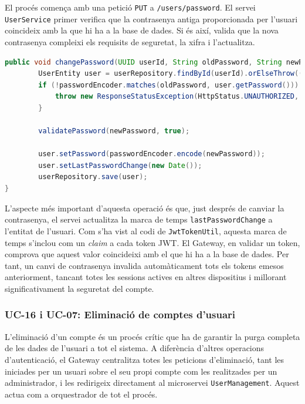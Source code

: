 El procés comença amb una petició \texttt{PUT} a \texttt{/users/password}. El servei \texttt{UserService} primer verifica que la contrasenya antiga proporcionada per l'usuari coincideix amb la que hi ha a la base de dades. Si és així, valida que la nova contrasenya compleixi els requisits de seguretat, la xifra i l'actualitza.

\begin{lstlisting}[language=Java, caption={Implementació del canvi de contrasenya a UserService}]
    public void changePassword(UUID userId, String oldPassword, String newPassword) {
        UserEntity user = userRepository.findById(userId).orElseThrow(() -> new ResponseStatusException(HttpStatus.NOT_FOUND, "User not found"));
        if (!passwordEncoder.matches(oldPassword, user.getPassword())) {
            throw new ResponseStatusException(HttpStatus.UNAUTHORIZED, "Current password is incorrect");
        }
        
        validatePassword(newPassword, true);
        
        user.setPassword(passwordEncoder.encode(newPassword));
        user.setLastPasswordChange(new Date());
        userRepository.save(user);
}
\end{lstlisting}

L'aspecte més important d'aquesta operació és que, just després de canviar la contrasenya, el servei actualitza la marca de temps \texttt{lastPasswordChange} a l'entitat de l'usuari. Com s'ha vist al codi de \texttt{JwtTokenUtil}, aquesta marca de temps s'inclou com un \textit{claim} a cada token JWT. El Gateway, en validar un token, comprova que aquest valor coincideixi amb el que hi ha a la base de dades. Per tant, un canvi de contrasenya invalida automàticament tots els tokens emesos anteriorment, tancant totes les sessions actives en altres dispositius i millorant significativament la seguretat del compte.

\subsubsection{UC-16 i UC-07: Eliminació de comptes d'usuari}

L'eliminació d'un compte és un procés crític que ha de garantir la purga completa de les dades de l'usuari a tot el sistema. A diferència d'altres operacions d'autenticació, el Gateway centralitza totes les peticions d'eliminació, tant les iniciades per un usuari sobre el seu propi compte com les realitzades per un administrador, i les redirigeix directament al microservei \texttt{UserManagement}. Aquest actua com a orquestrador de tot el procés.

